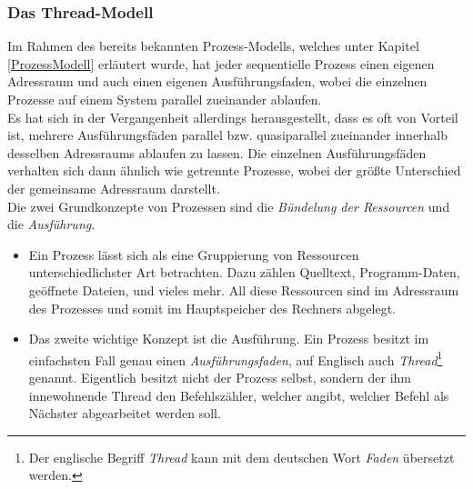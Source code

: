 			\subsubsection{Das Thread-Modell}

				Im Rahmen des bereits bekannten Prozess-Modells, welches unter Kapitel \ref{ProzessModell} erläutert wurde, hat jeder sequentielle Prozess einen eigenen Adressraum und auch einen eigenen Ausführungsfaden, wobei die einzelnen Prozesse auf einem System parallel zueinander ablaufen.\\
				Es hat sich in der Vergangenheit allerdings herausgestellt, dass es oft von Vorteil ist, mehrere Ausführungsfäden parallel bzw. quasiparallel zueinander innerhalb desselben Adressraums ablaufen zu lassen. Die einzelnen Ausführungsfäden verhalten sich dann ähnlich wie getrennte Prozesse, wobei der größte Unterschied der gemeinsame Adressraum darstellt.\\
				Die zwei Grundkonzepte von Prozessen sind die \textit{Bündelung der Ressourcen} und die \textit{Ausführung}.
				
				\begin{itemize}
					\item
						Ein Prozess lässt sich als eine Gruppierung von Ressourcen unterschiedlichster Art betrachten. Dazu zählen Quelltext, Programm-Daten, geöffnete Dateien, und vieles mehr. All diese Ressourcen sind im Adressraum des Prozesses und somit im Hauptspeicher des Rechners abgelegt.
					\item
						Das zweite wichtige Konzept ist die Ausführung. Ein Prozess besitzt im einfachsten Fall genau einen \textit{Ausführungsfaden}, auf Englisch auch \textit{Thread}\footnote{Der englische Begriff \textit{Thread} kann mit dem deutschen Wort \textit{Faden} übersetzt werden.} genannt. Eigentlich besitzt nicht der Prozess selbst, sondern der ihm innewohnende Thread den Befehlszähler, welcher angibt, welcher Befehl als Nächster abgearbeitet werden soll.
				\end{itemize}
			
